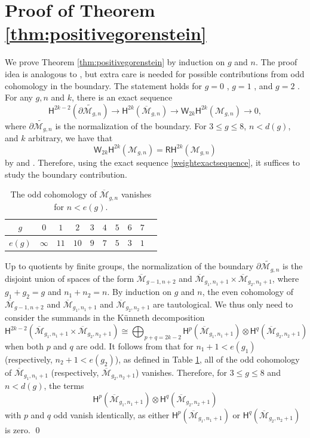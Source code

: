 \documentclass[12pt]{amsart}
\theoremstyle{definition}
\renewcommand{\H}{\mathsf{H}}
\newcommand{\RH}{\mathsf{RH}}
\newcommand{\M}{\mathcal{M}}
\renewcommand{\tilde}{\widetilde}
\newcommand{\Mb}{\overline{\M}}
\begin{document}
\section{Proof of Theorem \ref{thm:positivegorenstein}}\label{sec:posgorenstein}
We prove Theorem \ref{thm:positivegorenstein} by induction on $g$ and $n$. The proof idea is analogous to \cite[Lemma 4.1]{CL-CKgP}, but extra care is needed for possible contributions from odd cohomology in the boundary. The statement holds for $g=0$ \cite{Keel}, $g=1$ \cite{Petersengenusone}, and $g=2$ \cite{Petersen}.
For any $g,n$ and $k$, there is an exact sequence 
\begin{equation}\label{weightexactsequence}
\H^{2k-2}(\tilde{\partial \M_{g,n}})\rightarrow \H^{2k}(\Mb_{g,n})\rightarrow \mathsf{W}_{2k}\H^{2k}(\M_{g,n})\rightarrow 0,
\end{equation}
where $\tilde{\partial \M_{g,n}}$ is the normalization of the boundary. For $3\leq g\leq 8$, $n< d(g)$, and $k$ arbitrary, we have that 
\[
\mathsf{W}_{2k}\H^{2k}(\M_{g,n})=\RH^{2k}(\M_{g,n})
\]
by \cite[Theorem 1.4]{CL-CKgP} and \cite[Theorem 1.10 and Lemma 4.3]{CLP-ste}. Therefore, using the exact sequence \eqref{weightexactsequence}, it suffices to study the boundary contribution. 


\begin{table}[h!]
\centering
\begin{tabular}{|c|c|c|c|c|c|c|c|c|c|} 
 \hline
 $g$ & $0$ & $1$ & $2$ & $3$ & $4$ & $5$ & $6$ & $7$ \\
 \hline
 $e(g)$ & $\infty$ & $11$ & $10$ & $9$ & $7$ & $5$ & $3$ & $1$  \\ 
\hline
\end{tabular}
\vspace{.1in}
\caption{The odd cohomology of $\Mb_{g,n}$ vanishes for $n < e(g)$.}
\label{allcohtaut}
\end{table}

Up to quotients by finite groups, the normalization of the boundary $\tilde{\partial \M_{g,n}}$ is the disjoint union of spaces of the form $\Mb_{g-1,n+2}$ and $\Mb_{g_1,n_1+1}\times \Mb_{g_2,n_2+1}$, where $g_1+g_2=g$ and $n_1+n_2=n$. By induction on $g$ and $n$, the even cohomology of $\Mb_{g-1,n+2}$ and $\Mb_{g_1,n_1+1}$ and $\Mb_{g_2,n_2+1}$ are tautological. We thus only need to consider the summands in the K\"unneth decomposition
\[
\H^{2k-2}(\Mb_{g_1,n_1+1}\times \Mb_{g_2,n_2+1})\cong \bigoplus_{p+q=2k-2} \H^{p}(\Mb_{g_1,n_1+1})\otimes \H^{q}(\Mb_{g_2,n_2+1})
\]
when both $p$ and $q$ are odd. It follows from \cite[Theorem 1.4]{CL-CKgP} that for $n_1+1<e(g_1)$ (respectively, $n_2+1<e(g_2)$), as defined in Table \ref{allcohtaut}, all of the odd cohomology of $\Mb_{g_1,n_1+1}$ (respectively, $\Mb_{g_2,n_2+1}$) vanishes. Therefore, for $3\leq g\leq 8$ and $n<d(g)$, the terms \[\H^{p}(\Mb_{g_1,n_1+1})\otimes \H^{q}(\Mb_{g_2,n_2+1})\] with $p$ and $q$ odd vanish identically, as either $\H^{p}(\Mb_{g_1,n_1+1})$ or $\H^{q}(\Mb_{g_2,n_2+1})$ is zero. \qed 


\end{document}
